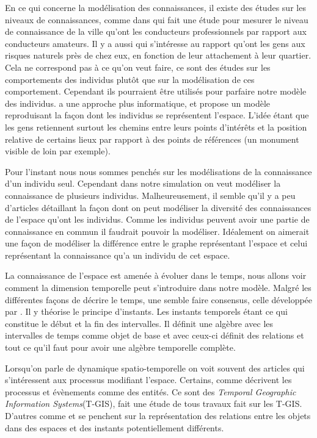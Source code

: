 \documentclass[a4paper]{article}
\begin{document}
En ce qui concerne la modélisation des connaissances, il existe des études sur
les niveaux de connaissances, comme dans \cite{stern1988} qui fait une étude
pour mesurer le niveau de connaissance de la ville qu'ont les conducteurs
professionnels par rapport aux conducteurs amateurs. Il y a aussi
\cite{quinn2018} qui s'intéresse au rapport qu'ont les gens aux risques naturels
près de chez eux, en fonction de leur attachement à leur quartier. Cela ne
correspond pas à ce qu'on veut faire, ce sont des études sur les comportements
des individus plutôt que sur la modélisation de ces comportement. Cependant ils
pourraient être utilisés pour parfaire notre modèle des individus.
\cite{kuipers1978} a une approche plus informatique, et propose un modèle
reproduisant la façon dont les individus se représentent l'espace. L'idée étant
que les gens retiennent surtout les chemins entre leurs points d'intérêts et la
position relative de certains lieux par rapport à des points de références (un
monument visible de loin par exemple).

Pour l'instant nous nous sommes penchés sur les modélisations de la connaissance
d'un individu seul. Cependant dans notre simulation on veut modéliser la
connaissance de plusieurs individus. Malheureusement, il semble qu'il y a peu
d'articles détaillant la façon dont on peut modéliser la diversité des
connaissances de l'espace qu'ont les individus. Comme les individus peuvent
avoir une partie de connaissance en commun il faudrait pouvoir la modéliser.
Idéalement on aimerait une façon de modéliser la différence entre le graphe
représentant l'espace et celui représentant la connaissance qu'a un individu de
cet espace.

La connaissance de l'espace est amenée à évoluer dans le temps, nous allons voir
comment la dimension temporelle peut s'introduire dans notre modèle. Malgré les
différentes façons de décrire le temps, une semble faire consensus, celle
développée par \cite{allen1985}. Il y théorise le principe d'instants. Les
instants temporels étant ce qui constitue le début et la fin des intervalles. Il
définit une algèbre avec les intervalles de temps comme objet de base et avec
ceux-ci définit des relations et tout ce qu'il faut pour avoir une algèbre
temporelle complète.

Lorsqu'on parle de dynamique spatio-temporelle on voit souvent des articles qui
s'intéressent aux processus modifiant l'espace. Certains, comme\linebreak
\cite{claramunt1995} décrivent les processus et évènements comme des entités. Ce
sont des \emph{Temporal Geographic Information Systems}(T-GIS),
\cite{siabato2018} fait une étude de tous travaux fait sur les T-GIS. D'autres
comme \cite{delmondo2011} et \cite{costes2015} se penchent sur la représentation
des relations entre les objets dans des espaces et des instants potentiellement
différents.
\end{document}
